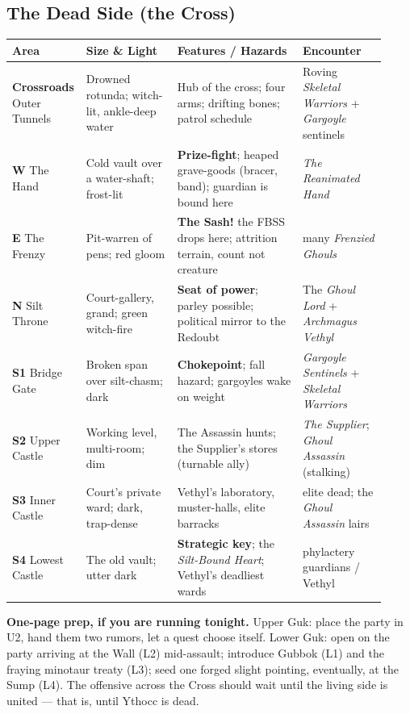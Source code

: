 \documentclass[10pt,twoside]{report}
\begin{document}
\subsection*{The Dead Side (the Cross)}
\begin{longtable}{@{}p{0.13\linewidth} p{0.24\linewidth} p{0.33\linewidth} p{0.22\linewidth}@{}}
\toprule
\textbf{\color{gukred}Area} & \textbf{\color{gukred}Size \& Light} & \textbf{\color{gukred}Features / Hazards} & \textbf{\color{gukred}Encounter} \\
\midrule
\endhead
\textbf{Crossroads} Outer Tunnels & Drowned rotunda; witch-lit, ankle-deep water & Hub of the cross; four arms; drifting bones; patrol schedule & Roving \emph{Skeletal Warriors} + \emph{Gargoyle} sentinels \\
\textbf{W} The Hand & Cold vault over a water-shaft; frost-lit & \textbf{Prize-fight}; heaped grave-goods (bracer, band); guardian is bound here & \emph{The Reanimated Hand} \\
\textbf{E} The Frenzy & Pit-warren of pens; red gloom & \textbf{The Sash!} the FBSS drops here; attrition terrain, count not creature & many \emph{Frenzied Ghouls} \\
\textbf{N} Silt Throne & Court-gallery, grand; green witch-fire & \textbf{Seat of power}; parley possible; political mirror to the Redoubt & The \emph{Ghoul Lord} + \emph{Archmagus Vethyl} \\
\textbf{S1} Bridge Gate & Broken span over silt-chasm; dark & \textbf{Chokepoint}; fall hazard; gargoyles wake on weight & \emph{Gargoyle Sentinels} + \emph{Skeletal Warriors} \\
\textbf{S2} Upper Castle & Working level, multi-room; dim & The Assassin hunts; the Supplier's stores (turnable ally) & \emph{The Supplier}; \emph{Ghoul Assassin} (stalking) \\
\textbf{S3} Inner Castle & Court's private ward; dark, trap-dense & Vethyl's laboratory, muster-halls, elite barracks & elite dead; the \emph{Ghoul Assassin} lairs \\
\textbf{S4} Lowest Castle & The old vault; utter dark & \textbf{Strategic key}; the \emph{Silt-Bound Heart}; Vethyl's deadliest wards & phylactery guardians / Vethyl \\
\bottomrule
\end{longtable}

\vspace{1em}
\begin{gmnote}
\textbf{One-page prep, if you are running tonight.} Upper Guk: place the party in U2, hand them two rumors, let a quest choose itself. Lower Guk: open on the party arriving at the Wall (L2) mid-assault; introduce Gubbok (L1) and the fraying minotaur treaty (L3); seed one forged slight pointing, eventually, at the Sump (L4). The offensive across the Cross should wait until the living side is united --- that is, until Ythocc is dead.
\end{gmnote}
\end{document}
